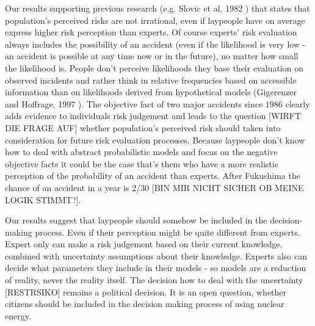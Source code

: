 {Our results supporting previous research (e.g. Slovic et al, 1982 \citep{Slovic:1982vr}) that states that population's perceived risks are not irrational, even if laypeople have on average express higher risk perception than experts. Of course experts' risk evaluation always includes the possibility of an accident (even if the likelihood is very low - an accident is possible at any time now or in the future), no matter how small the likelihood is. People don't perceive likelihoods they base their evaluation on observed incidents and rather think in relative frequencies based on accessible information than on likelihoods derived from hypothetical models (Gigerenzer and Hoffrage, 1997   \citep{gigerenzer_how_1995}). The objective fact of two major accidents since 1986 clearly adds evidence to individuals risk judgement and leads to the question [WIRFT DIE FRAGE AUF] whether population's perceived risk should taken into consideration for future risk evaluation processes.  Because laypeople don't know how to deal with abstract probabilistic models and focus on the negative objective facts it could be the case that's them who have a more realistic perception of the probability of an accident than experts. After Fukushima the chance of an accident in a year is 2/30 [BIN MIR NICHT SICHER OB MEINE LOGIK STIMMT?].  
 

Our results suggest that laypeople should somehow be included in the decision-making process. Even if their perception might be quite different from experts. Expert only can make a risk judgement based on their current knowledge, combined with uncertainty assumptions about their knowledge. Experts also can decide what parameters they include in their models - so models are a reduction of reality, never the reality itself. The decision how to deal with the uncertainty [RESTRSIKO]  remains a political decision. It is an open question, whether citizens should be included in the decision making process of using nuclear energy. 

                               

}
